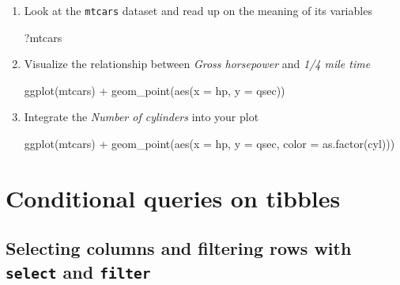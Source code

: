 \documentclass[
  letterpaper,
]{book}
\newenvironment{Shaded}{}{}
\newcommand{\AttributeTok}[1]{\textcolor[rgb]{0.84,0.23,0.29}{#1}}
\newcommand{\FunctionTok}[1]{\textcolor[rgb]{0.44,0.26,0.76}{#1}}
\newcommand{\NormalTok}[1]{\textcolor[rgb]{0.14,0.16,0.18}{#1}}
\newcommand{\SpecialCharTok}[1]{\textcolor[rgb]{0.00,0.36,0.77}{#1}}
\begin{document}
\begin{enumerate}
\def\labelenumi{\arabic{enumi}.}
\item
  Look at the \texttt{mtcars} dataset and read up on the meaning of its
  variables

\begin{Shaded}
\begin{Highlighting}[]
\NormalTok{?mtcars}
\end{Highlighting}
\end{Shaded}
\item
  Visualize the relationship between \emph{Gross horsepower} and
  \emph{1/4 mile time}

\begin{Shaded}
\begin{Highlighting}[]
\FunctionTok{ggplot}\NormalTok{(mtcars) }\SpecialCharTok{+} \FunctionTok{geom\_point}\NormalTok{(}\FunctionTok{aes}\NormalTok{(}\AttributeTok{x =}\NormalTok{ hp, }\AttributeTok{y =}\NormalTok{ qsec))}
\end{Highlighting}
\end{Shaded}
\item
  Integrate the \emph{Number of cylinders} into your plot

\begin{Shaded}
\begin{Highlighting}[]
\FunctionTok{ggplot}\NormalTok{(mtcars) }\SpecialCharTok{+} \FunctionTok{geom\_point}\NormalTok{(}\FunctionTok{aes}\NormalTok{(}\AttributeTok{x =}\NormalTok{ hp, }\AttributeTok{y =}\NormalTok{ qsec, }\AttributeTok{color =} \FunctionTok{as.factor}\NormalTok{(cyl)))}
\end{Highlighting}
\end{Shaded}
\end{enumerate}

\hypertarget{conditional-queries-on-tibbles}{%
\section{Conditional queries on
tibbles}\label{conditional-queries-on-tibbles}}

\hypertarget{selecting-columns-and-filtering-rows-with-select-and-filter}{%
\subsection{\texorpdfstring{Selecting columns and filtering rows with
\texttt{select} and
\texttt{filter}}{Selecting columns and filtering rows with select and filter}}\label{selecting-columns-and-filtering-rows-with-select-and-filter}}
\end{document}
